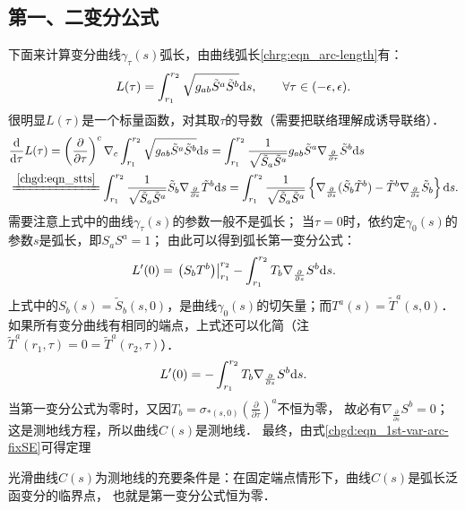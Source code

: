 \subsection{第一、二变分公式}
下面来计算变分曲线$\gamma_\tau(s)$弧长，由曲线弧长\eqref{chrg:eqn_arc-length}有：
\begin{equation}
    L(\tau)=\int_{r_1}^{r_2} \sqrt{g_{ab} \tilde{S}^a \tilde{S}^b} {\rm d}s,
     \qquad \forall \tau \in (-\epsilon,\epsilon) .
\end{equation}
很明显$L(\tau)$是一个标量函数，对其取$\tau$的导数（需要把联络理解成诱导联络）．
\setlength{\mathindent}{0em}
\begin{align}
    &\frac{{\rm d}}{{\rm d} \tau }L(\tau)= \left(\frac{\partial}{\partial \tau}\right)^c \nabla_c
    \int_{r_1}^{r_2} \sqrt{ g_{ab} \tilde{S}^a \tilde{S}^b } {\rm d}s
    =  \int_{r_1}^{r_2} \frac{1}{\sqrt{ \tilde{S}_a \tilde{S}^a } } g_{ab} \tilde{S}^a
     \nabla_{\frac{\partial}{\partial \tau}} \tilde{S}^b {\rm d}s        \label{chgd:eqn_1st-tmp02} \\
    &\xlongequal{\ref{chgd:eqn_stts}} 
      \int_{r_1}^{r_2} \frac{1}{\sqrt{ \tilde{S}_a \tilde{S}^a } }
      \tilde{S}_b \nabla_{\frac{\partial}{\partial s}} \tilde{T}^b {\rm d}s
    =\int_{r_1}^{r_2}\frac{1}{\sqrt{ \tilde{S}_a \tilde{S}^a } }
    \left\{ \nabla_{\frac{\partial}{\partial s}} (\tilde{S}_b  \tilde{T}^b)
     -  \tilde{T}^b \nabla_{\frac{\partial}{\partial s}} \tilde{S}_b \right\} {\rm d}s . \notag
\end{align}\setlength{\mathindent}{2em}
需要注意上式中的曲线$\gamma_\tau(s)$的参数一般不是弧长；
当$\tau=0$时，依约定$\gamma_0(s)$的参数$s$是弧长，即${S}_a {S}^a=1$；
由此可以得到{\heiti 弧长第一变分公式}：  
\begin{equation}\label{chgd:eqn_1st-var-arc}
    L'(0)= \left.\left({S}_b  {T}^b\right)\right|_{r_1}^{r_2} - \int_{r_1}^{r_2}
    {T}_b \nabla_{\frac{\partial}{\partial s}} {S}^b {\rm d}s .
\end{equation}
上式中的$S_b(s)=\tilde{S}_b(s,0)$，是曲线$\gamma_0(s)$的切矢量；而$T^a(s)= \tilde{T}^a(s,0)$．
如果所有变分曲线有相同的端点，上式还可以化简（注$\tilde{T}^a(r_1,\tau)=0=\tilde{T}^a(r_2,\tau)$）．
\begin{equation}\label{chgd:eqn_1st-var-arc-fixSE}
    L'(0)= -\int_{r_1}^{r_2} {T}_b  \nabla_{\frac{\partial}{\partial s}} {S}^b {\rm d}s .
\end{equation}
当第一变分公式为零时，又因${T}_b=\sigma_{*(s,0)}\left(\frac{\partial}{\partial \tau}\right)^a$不恒为零，
故必有$\nabla_{\frac{\partial}{\partial s}} {S}^b=0$；这是测地线方程，所以曲线$C(s)$是测地线．
最终，由式\eqref{chgd:eqn_1st-var-arc-fixSE}可得定理
\begin{theorem}\label{chgd:thm_geo-1st-var}
    光滑曲线$C(s)$为测地线的充要条件是：在固定端点情形下，曲线$C(s)$是弧长泛函变分的临界点，
    也就是第一变分公式恒为零．
\end{theorem}


